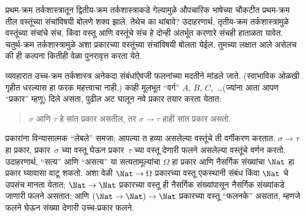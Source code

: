 \documentclass[../../../include/open-logic-section]{subfiles}
\begin{document}


प्रथम-क्रम तर्कशास्त्रातून द्वितीय-क्रम तर्कशास्त्राकडे गेल्यामुळे औपचारिक
भाषेच्या चौकटीत प्रथम-क्रम तील वस्तूंच्या संचांविषयी बोलणे शक्य
झाले. तेथेच का थांबावे? उदाहरणार्थ, तृतीय-क्रम तर्कशास्त्रामुळे वस्तूंच्या
संचांचे संच, किंवा वस्तू आणि वस्तूंचे संच हे दोन्ही अंतर्भूत करणारे संचही
हाताळता यावेत. चतुर्थ-क्रम तर्कशास्त्रामुळे अशा प्रकारच्या वस्तूंच्या
संचांविषयी बोलता येईल. तुमच्या लक्षात आले असेलच की ही कल्पना कितीही वेळा
पुनरावृत्त करता येते.

व्यवहारात उच्च-क्रम तर्कशास्त्र अनेकदा संबंधांऐवजी फलनांच्या मदतीने
मांडले जाते. (स्वाभाविक ओळखी गृहीत धरल्यास हा फरक महत्त्वाचा
नाही.) काही मूलभूत “वर्ग” $A$, $B$, $C$,~\dots (ज्यांना आता आपण “प्रकार”
म्हणू) दिले असता, पुढील अट घालून नवे प्रकार तयार करता येतात:
\begin{quote}
$\sigma$ आणि $\tau$ हे सांत प्रकार असतील, तर $\sigma \to \tau$ हाही सांत
प्रकार असतो.
\end{quote}
प्रकारांना विन्यासात्मक “लेबले” समजा; आपल्या त हव्या असलेल्या
वस्तूंचे ती वर्गीकरण करतात. $\sigma \to \tau$ हा प्रकार, प्रकार~$\sigma$ च्या
वस्तू घेऊन प्रकार~$\tau$ च्या वस्तू देणारी फलने असलेल्या वस्तूंचे वर्णन करतो.
उदाहरणार्थ, “सत्य” आणि “असत्य” या सत्यतामूल्यांचा $\Omega$ हा प्रकार आणि
नैसर्गिक संख्यांचा $\Nat$ हा प्रकार घ्यावासा वाटू शकतो. अशा वेळी $\Nat \to
\Omega$ प्रकारच्या वस्तू एकस्थानी संबंध किंवा $\Nat$ चे उपसंच मानता येतात;
$\Nat \to \Nat$ प्रकारच्या वस्तू ही नैसर्गिक संख्यांपासून नैसर्गिक संख्यांकडे
जाणारी फलने असतात; आणि $(\Nat \to \Nat) \to \Nat$ प्रकारच्या वस्तू
“फलनके” असतात, म्हणजे फलने घेऊन संख्या देणारी उच्च-प्रकार फलने.
\end{document}
